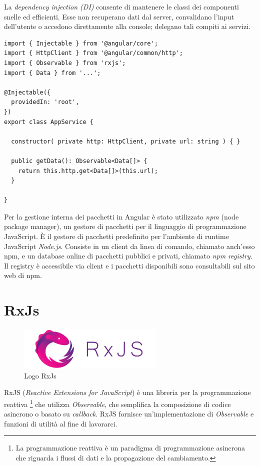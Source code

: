 La \textit{dependency injection (DI)} consente di mantenere le classi dei componenti snelle ed efficienti. Esse non recuperano dati dal server, convalidano l'input dell'utente o accedono direttamente alla console; delegano tali compiti ai servizi. \cite{ANGULAR}
\begin{lstlisting}[caption={Esempio di un Service in Angular}, style=javaScriptCode]
import { Injectable } from '@angular/core';
import { HttpClient } from '@angular/common/http';
import { Observable } from 'rxjs';
import { Data } from '...';

@Injectable({
  providedIn: 'root',
})
export class AppService {

  constructor( private http: HttpClient, private url: string ) { }
  
  public getData(): Observable<Data[]> {
    return this.http.get<Data[]>(this.url);
  }

}
\end{lstlisting}
Per la gestione interna dei pacchetti in Angular è stato utilizzato \textit{npm} (node package manager), un gestore di pacchetti per il linguaggio di programmazione JavaScript. È il gestore di pacchetti predefinito per l'ambiente di runtime JavaScript \textit{Node.js}. Consiste in un client da linea di comando, chiamato anch'esso npm, e un database online di pacchetti pubblici e privati, chiamato \textit{npm registry}.
Il registry è accessibile via client e i pacchetti disponibili sono consultabili sul sito web di npm. \cite{NPM}

\section{RxJs}
\begin{figure}[h!]
\begin{center}
  \includegraphics[width=7cm]{images/RxJs.png}
  \caption{Logo RxJs}
\end{center}
\end{figure}
RxJS (\textit{Reactive Extensions for JavaScript}) è una libreria per la programmazione reattiva \footnote{La programmazione reattiva è un paradigma di programmazione asincrona che riguarda i flussi di dati e la propagazione del cambiamento.} che utilizza \textit{Observable}, che semplifica la composizione di codice asincrono o basato su \textit{callback}. RxJS fornisce un'implementazione di \textit{Observable} e funzioni di utilità al fine di lavorarci. \cite{RxJS} 

